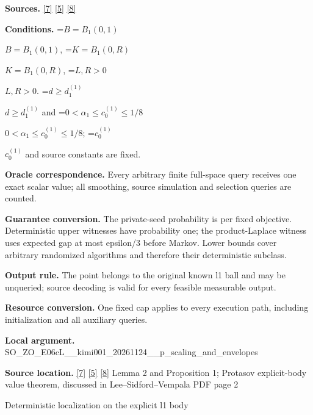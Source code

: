 \documentclass[10pt,a4paper]{article}
\newcommand{\AtlasMath}[1]{\par\begingroup\centering\setbox0=\hbox{$\displaystyle #1$}\ifdim\wd0>1.4\linewidth\typeout{ATLAS WIDE FORMULA: \the\wd0}\fi\ifdim\wd0>\linewidth\resizebox{\linewidth}{!}{\box0}\else\box0\fi\par\endgroup}
\newcommand{\AtlasInlineMath}[1]{\begingroup\setbox0=\hbox{$#1$}\ifdim\wd0>.4\linewidth\endgroup\AtlasMath{#1}\else\endgroup$#1$\fi}
\begin{document}
\textbf{Sources.} \href{https://github.com/WU-Wendao/Colombo/blob/main/colombo_sensorium/Complexity_altas/data/sources/colombo/COLOMBO_KIMI_001/kimi_001.pdf}{[7]} \href{https://www.mathnet.ru/php/archive.phtml?jrnid=mzm&option_lang=eng&paperid=1697&wshow=paper}{[5]} \href{https://arxiv.org/pdf/1706.07357}{[8]}



\textbf{Conditions.} \AtlasInlineMath{B=B_1(0,1)}, \AtlasInlineMath{K=B_1(0,R)}, \AtlasInlineMath{L,R>0}. \AtlasInlineMath{d\ge d_1^{(1)}} and \AtlasInlineMath{0<\alpha_1\le c_0^{(1)}\le1/8}; \AtlasInlineMath{c_0^{(1)}} and source constants are fixed.



\textbf{Oracle correspondence.} Every arbitrary finite full-space query receives one exact scalar value; all smoothing, source simulation and selection queries are counted.



\textbf{Guarantee conversion.} The private-seed probability is per fixed objective. Deterministic upper witnesses have probability one; the product-Laplace witness uses expected gap at most epsilon/3 before Markov. Lower bounds cover arbitrary randomized algorithms and therefore their deterministic subclass.



\textbf{Output rule.} The point belongs to the original known l1 ball and may be unqueried; source decoding is valid for every feasible measurable output.



\textbf{Resource conversion.} One fixed cap applies to every execution path, including initialization and all auxiliary queries.



\textbf{Local argument.} SO\_ZO\_E06cL\_\_kimi001\_202\allowbreak{}61124\_\_p\_scaling\_and\_env\allowbreak{}elopes



\textbf{Source location.} \href{https://github.com/WU-Wendao/Colombo/blob/main/colombo_sensorium/Complexity_altas/data/sources/colombo/COLOMBO_KIMI_001/kimi_001.pdf}{[7]} \href{https://www.mathnet.ru/php/archive.phtml?jrnid=mzm&option_lang=eng&paperid=1697&wshow=paper}{[5]} \href{https://arxiv.org/pdf/1706.07357}{[8]} Lemma 2 and Proposition 1; Protasov explicit-body value theorem, discussed in Lee--Sidford--Vempala PDF page 2



Deterministic localization on the explicit l1 body
\end{document}
